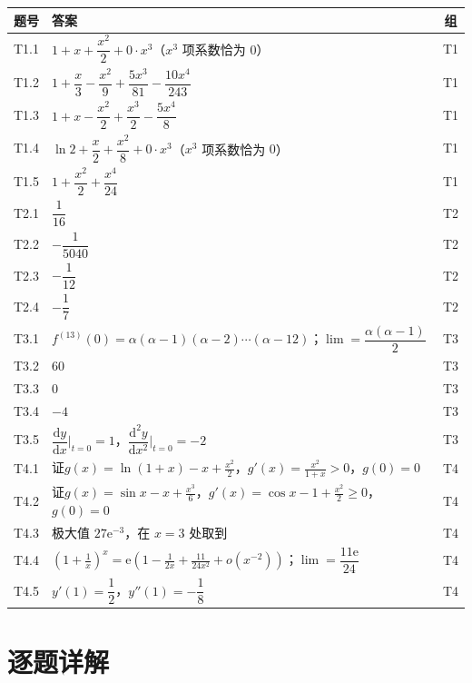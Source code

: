 \documentclass[11pt,a4paper]{ctexart}
\newcommand{\ee}{\mathrm{e}}
\newcommand{\D}{\mathrm{d}}
\begin{document}
\begin{center}
\small\setlength{\tabcolsep}{5pt}
\begin{tabularx}{\linewidth}{c|X|c}
\toprule
题号 & 答案 & 组 \\
\midrule
T1.1 & $1+x+\dfrac{x^{2}}{2}+0\cdot x^{3}$（$x^{3}$ 项系数恰为 $0$） & T1 \\
T1.2 & $1+\dfrac{x}{3}-\dfrac{x^{2}}{9}+\dfrac{5x^{3}}{81}-\dfrac{10x^{4}}{243}$ & T1 \\
T1.3 & $1+x-\dfrac{x^{2}}{2}+\dfrac{x^{3}}{2}-\dfrac{5x^{4}}{8}$ & T1 \\
T1.4 & $\ln 2+\dfrac{x}{2}+\dfrac{x^{2}}{8}+0\cdot x^{3}$（$x^{3}$ 项系数恰为 $0$） & T1 \\
T1.5 & $1+\dfrac{x^{2}}{2}+\dfrac{x^{4}}{24}$ & T1 \\
\midrule
T2.1 & $\dfrac1{16}$ & T2 \\
T2.2 & $-\dfrac1{5040}$ & T2 \\
T2.3 & $-\dfrac1{12}$ & T2 \\
T2.4 & $-\dfrac17$ & T2 \\
\midrule
T3.1 & $f^{(13)}(0)=\alpha(\alpha-1)(\alpha-2)\cdots(\alpha-12)$；$\lim=\dfrac{\alpha(\alpha-1)}{2}$ & T3 \\
T3.2 & $60$ & T3 \\
T3.3 & $0$ & T3 \\
T3.4 & $-4$ & T3 \\
T3.5 & $\dfrac{\D y}{\D x}\big|_{t=0}=1$，$\dfrac{\D^{2}y}{\D x^{2}}\big|_{t=0}=-2$ & T3 \\
\midrule
T4.1 & 证$g(x)=\ln(1+x)-x+\frac{x^{2}}{2}$，$g'(x)=\frac{x^{2}}{1+x}>0$，$g(0)=0$ & T4 \\
T4.2 & 证$g(x)=\sin x-x+\frac{x^{3}}{6}$，$g'(x)=\cos x-1+\frac{x^{2}}{2}\ge0$，$g(0)=0$ & T4 \\
T4.3 & 极大值 $27\ee^{-3}$，在 $x=3$ 处取到 & T4 \\
T4.4 & $(1+\frac1x)^{x}=\ee\left(1-\frac{1}{2x}+\frac{11}{24x^{2}}+o(x^{-2})\right)$；$\lim=\dfrac{11\ee}{24}$ & T4 \\
T4.5 & $y'(1)=\dfrac12$，$y''(1)=-\dfrac18$ & T4 \\
\bottomrule
\end{tabularx}
\end{center}

\section{逐题详解}
\end{document}
